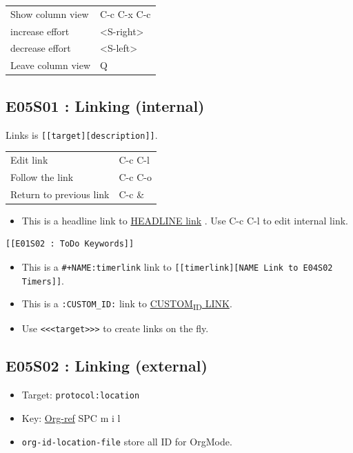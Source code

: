 \documentclass[11pt]{article}
\begin{document}
\begin{center}
\begin{tabular}{ll}
Show column view &  C-c C-x C-c \\
increase effort &  <S-right> \\
decrease effort &  <S-left> \\
Leave column view &  Q \\
\end{tabular}
\end{center}

\subsection{E05S01 : Linking (internal)}
\label{sec:orgd547a85}
Links is \texttt{[[target][description]]}. 

\begin{center}
\begin{tabular}{ll}
Edit link &  C-c C-l \\
Follow the link &  C-c C-o \\
Return to previous link &  C-c \& \\
\end{tabular}
\end{center}

\begin{itemize}
\item This is a headline link to \hyperref[sec:org9acc633]{HEADLINE link} . Use  C-c
C-l  to edit internal link.
\end{itemize}
\begin{verbatim}
[[E01S02 : ToDo Keywords]]
\end{verbatim}
\begin{itemize}
\item This is a \texttt{\#+NAME:timerlink} link to \texttt{[[timerlink][NAME Link to E04S02 Timers]]}.
\item This is a \texttt{:CUSTOM\_ID:} link to \hyperref[sec:orgfe5fbc8]{CUSTOM\textsubscript{ID} LINK}.
\item Use \texttt{<<<target>>>} to create links on the fly.
\end{itemize}
\subsection{E05S02 : Linking (external)}
\label{sec:org16bd248}
\begin{itemize}
\item Target: \texttt{protocol:location}
\item Key: \href{https://github.com/jkitchin/org-ref}{Org-ref}  SPC m i l
\item \texttt{org-id-location-file} store all ID for OrgMode.
\end{itemize}
\end{document}
